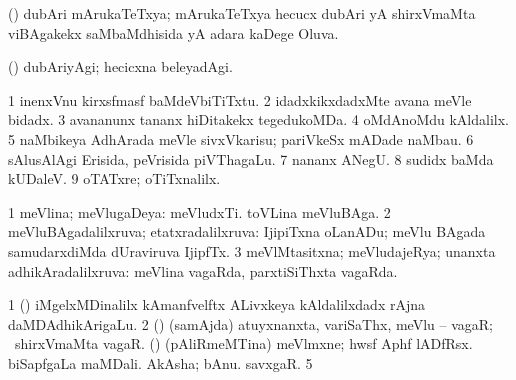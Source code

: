 {{\bentry
{} 
\gl{\gu}
\expl{}
\bmng
(\birx) dubAri mArukaTeTxya; mArukaTeTxya hecucx dubAri yA shirxVmaMta viBAgakekx saMbaMdhisida yA adara kaDege Oluva. 
\emng
\eentry

\bentry
{} 
\gl{\kirxvi}
\expl{}
\bmng
(\birx) dubAriyAgi; hecicxna beleyadAgi. 
\emng
\eentry

\bentry
{} 
\gl{\gu}
\expl{}
\bmng
{} 
\emng
\eentry

\bentry
{} 
\gl{\kirxvi}
\expl{}
\bmng
{} 
\emng
\eentry

\bentry
{} 
\gl{\upa}
\expl{}
\bmng
{} 
\emng

\noindent
\gl{\pagu}
\expl{}
\bmng
\bnum
\num{1}  inenxVnu kirxsfmasf baMdeVbiTiTxtu. 
\num{2}  idadxkikxdadxMte avana meVle bidadx. 
\num{3}  avananunx tananx hiDitakekx tegedukoMDa. 
\num{4}  oMdAnoMdu kAldalilx. 
\num{5}  naMbikeya AdhArada meVle sivxVkarisu; pariVkeSx mADade naMbau. 
\num{6}  sAlusAlAgi Erisida, peVrisida piVThagaLu. 
\num{7}  nananx ANegU. 
\num{8}  sudidx baMda kUDaleV. 
\num{9}  oTATxre; oTiTxnalilx. 
\enum
\emng
\eentry

\bentry
{} 
\gl{\gu}
\expl{}
\bmng
\bnum
\num{1} meVlina; meVlugaDeya:  meVludxTi.  toVLina meVluBAga. 
\num{2} meVluBAgadalilxruva; etatxradalilxruva:  IjipiTxna oLanADu; meVlu BAgada samudarxdiMda dUraviruva IjipfTx. 
\num{3} meVlMtasitxna; meVludajeRya; unanxta adhikAradalilxruva:  meVlina vagaRda, parxtiSiThxta vagaRda. 
\enum
\emng

\noindent
\gl{\pagu}
\expl{}
\bmng
\bnum
\num{1}  (\ca) iMgelxMDinalilx kAmanfvelftx ALivxkeya kAldalilxdadx rAjna daMDAdhikArigaLu. 
\num{2}  (\AmA) (samAjda) atuyxnanxta, variSaThx, meVlu -- vagaR; \kanmu\ shirxVmaMta vagaR. 
  (\birx) 
\banum
{} (pAliRmeMTina) meVlmxne; hwsf Aphf lADfRsx. 
 biSapfgaLa maMDali. 
\eanum
\numie
{}  
\banum
{} AkAsha; bAnu. 
 savxgaR.
\eanum
\numie
\num{5}  
\enum
\emng
\eentry

}}

